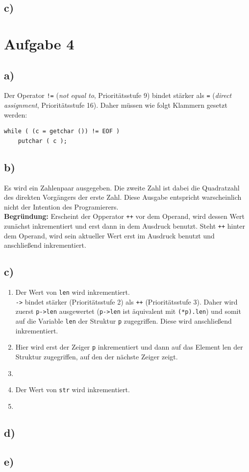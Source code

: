 \documentclass[11pt, a4paper]{scrartcl}
\begin{document}
\subsection*{c)}
\section*{Aufgabe 4}
\subsection*{a)} 
Der Operator \texttt{!=} (\textit{not equal to}, Prioritätsstufe 9) bindet stärker als \texttt{=} (\textit{direct assignment}, Prioritätsstufe 16). Daher müssen wie folgt Klammern gesetzt werden:
\begin{lstlisting}
while ( (c = getchar ()) != EOF )
	putchar ( c );
\end{lstlisting}
%
\subsection*{b)}
Es wird ein Zahlenpaar ausgegeben. Die zweite Zahl ist dabei die Quadratzahl des direkten Vorgängers der erste Zahl. Diese Ausgabe entspricht warscheinlich nicht der Intention des Programierers. \\

\noindent
\textbf{Begründung:} Erscheint der Opperator \texttt{++} vor dem Operand, wird dessen Wert zunächst inkrementiert und erst dann in  dem Ausdruck benutzt. Steht \texttt{++} hinter dem Operand, wird sein aktueller Wert erst im Ausdruck benutzt und anschließend inkrementiert.
\subsection*{c)}
\begin{enumerate}
\item Der Wert von \texttt{len} wird inkrementiert. \\
\texttt{->} bindet stärker (Prioritätsstufe 2) als \texttt{++} (Prioritätsstufe 3). Daher wird zuerst \texttt{p->len} ausgewertet (\texttt{p->len} ist äquivalent mit \texttt{(*p).len}) und somit auf die Variable \texttt{len} der Struktur \texttt{p} zugegriffen. Diese wird anschließend inkrementiert.
\item Hier wird erst der Zeiger \texttt{p} inkrementiert und dann auf das Element len der Struktur zugegriffen, auf den der nächste Zeiger zeigt.
\item
\item Der Wert von \texttt{str} wird inkrementiert.
\item

\end{enumerate}
\subsection*{d)}
\subsection*{e)}


\end{document}
